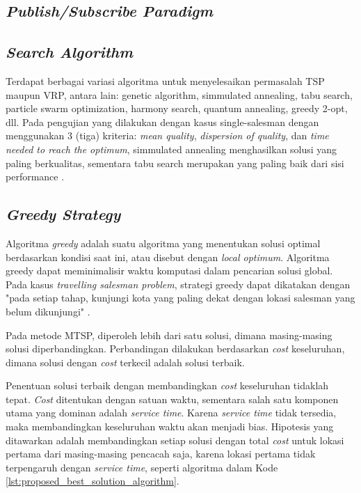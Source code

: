 \subsection{\textit{Publish/Subscribe Paradigm}}



\subsection{\textit{Search Algorithm}}
Terdapat berbagai variasi algoritma untuk menyelesaikan permasalah TSP maupun VRP, antara lain: genetic algorithm, simmulated annealing, tabu search, particle swarm optimization, harmony search, quantum annealing, greedy 2-opt, dll. Pada pengujian yang dilakukan dengan kasus single-salesman dengan menggunakan 3 (tiga) kriteria: \textit{mean quality}, \textit{dispersion of quality}, dan \textit{time needed to reach the optimum}, simmulated annealing menghasilkan solusi yang paling berkualitas, sementara tabu search merupakan yang paling baik dari sisi performance \citep{antosiewicz_choice_2013}.


\subsection{\textit{Greedy Strategy}}
Algoritma \textit{greedy} adalah suatu algoritma yang menentukan solusi optimal berdasarkan kondisi saat ini, atau disebut dengan \textit{local optimum}. Algoritma greedy dapat meminimalisir waktu komputasi dalam pencarian solusi global. Pada kasus \textit{travelling salesman problem}, strategi greedy dapat dikatakan dengan "pada setiap tahap, kunjungi kota yang paling dekat dengan lokasi salesman yang belum dikunjungi" \citep{paul_e._black_greedy_2005}. 


Pada metode MTSP, diperoleh lebih dari satu solusi, dimana masing-masing solusi diperbandingkan. Perbandingan dilakukan berdasarkan \textit{cost} keseluruhan, dimana solusi dengan \textit{cost} terkecil adalah solusi terbaik.


Penentuan solusi terbaik dengan membandingkan \textit{cost} keseluruhan tidaklah tepat. \textit{Cost} ditentukan dengan satuan waktu, sementara salah satu komponen utama yang dominan adalah \textit{service time}. Karena \textit{service time} tidak tersedia, maka membandingkan keseluruhan waktu akan menjadi bias. Hipotesis yang ditawarkan adalah membandingkan setiap solusi dengan total \textit{cost} untuk lokasi pertama dari masing-masing pencacah saja, karena lokasi pertama tidak terpengaruh dengan \textit{service time}, seperti algoritma dalam Kode \ref{lst:proposed_best_solution_algorithm}.


